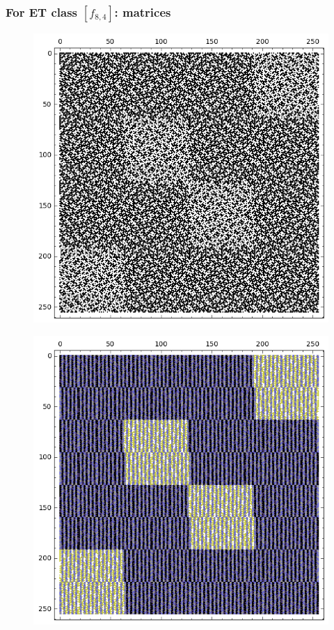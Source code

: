 \documentclass[pdf,sprung,slideColor,nocolorBG]{beamer}
\begin{document}
\begin{frame}
\frametitle{For ET class $[f_{8,4}]$: matrices}
\begin{figure}
\centering
\begin{minipage}{.48\textwidth}
  \centering
  \includegraphics[width=.9\linewidth]{../matrix_plot/c8_4_weight_class_matrix.png}
  \label{fig:8_4_weight_class_matrix}
\end{minipage}%
\begin{minipage}{.48\textwidth}
  \centering
  \includegraphics[width=.9\linewidth]{../matrix_plot/c8_4_bent_cayley_graph_index_matrix.png}
  \label{fig:8_4_bent_cayley_graph_index_matrix}
\end{minipage}
\end{figure}
~
\end{frame}
\end{document}
